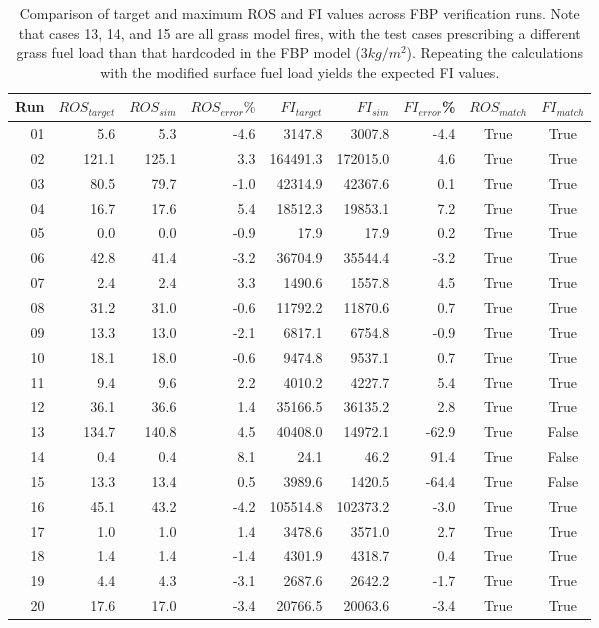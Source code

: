 \begin{table}[h!]
\centering
\begin{tabular}{r r r r r r r c c}
\hline
Run & $ROS_{target}$ & $ROS_{sim}$ & $ROS_{error}\% $ & $FI_{target}$ & $FI_{sim}$ & $FI_{error}$\% & $ROS_{match}$ & $FI_{match}
$ \\
\hline
01 & 5.6  & 5.3  & -4.6 & 3147.8  & 3007.8  & -4.4 & True & True \\
02 & 121.1 & 125.1 & 3.3  & 164491.3 & 172015.0 & 4.6 & True & True \\
03 & 80.5 & 79.7 & -1.0 & 42314.9 & 42367.6 & 0.1 & True & True \\
04 & 16.7 & 17.6 & 5.4 & 18512.3 & 19853.1 & 7.2 & True & True \\
05 & 0.0 & 0.0 & -0.9 & 17.9 & 17.9 & 0.2 & True & True \\
06 & 42.8 & 41.4 & -3.2 & 36704.9 & 35544.4 & -3.2 & True & True \\
07 & 2.4 & 2.4 & 3.3 & 1490.6 & 1557.8 & 4.5 & True & True \\
08 & 31.2 & 31.0 & -0.6 & 11792.2 & 11870.6 & 0.7 & True & True \\
09 & 13.3 & 13.0 & -2.1 & 6817.1 & 6754.8 & -0.9 & True & True \\
10 & 18.1 & 18.0 & -0.6 & 9474.8 & 9537.1 & 0.7 & True & True \\
11 & 9.4 & 9.6 & 2.2 & 4010.2 & 4227.7 & 5.4 & True & True \\
12 & 36.1 & 36.6 & 1.4 & 35166.5 & 36135.2 & 2.8 & True & True \\
13 & 134.7 & 140.8 & 4.5 & 40408.0 & 14972.1 & -62.9 & True & False \\
14 & 0.4 & 0.4 & 8.1 & 24.1 & 46.2 & 91.4 & True & False \\
15 & 13.3 & 13.4 & 0.5 & 3989.6 & 1420.5 & -64.4 & True & False \\
16 & 45.1 & 43.2 & -4.2 & 105514.8 & 102373.2 & -3.0 & True & True \\
17 & 1.0 & 1.0 & 1.4 & 3478.6 & 3571.0 & 2.7 & True & True \\
18 & 1.4 & 1.4 & -1.4 & 4301.9 & 4318.7 & 0.4 & True & True \\
19 & 4.4 & 4.3 & -3.1 & 2687.6 & 2642.2 & -1.7 & True & True \\
20 & 17.6 & 17.0 & -3.4 & 20766.5 & 20063.6 & -3.4 & True & True \\
\hline
\end{tabular}
\caption{Comparison of target and maximum ROS and FI values across FBP verification runs. Note that cases 13, 14, and 15 are all grass model fires, with the test cases prescribing a different grass fuel load than that hardcoded in the FBP model ($3 kg/m^2$). Repeating the calculations with the modified surface fuel load yields the expected FI values.}
\end{table}